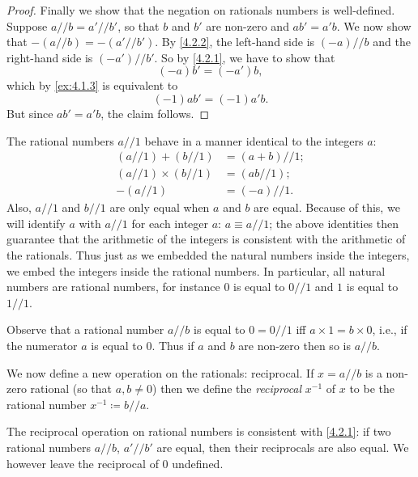 \begin{proof}
  Finally we show that the negation on rationals numbers is well-defined.
  Suppose \(a // b = a' // b'\), so that \(b\) and \(b'\) are non-zero and \(ab' = a'b\).
  We now show that \(-(a // b) = -(a' // b')\).
  By \cref{4.2.2}, the left-hand side is \((-a) // b\) and the right-hand side is \((-a') // b'\).
  So by \cref{4.2.1}, we have to show that
  \[
    (-a)b' = (-a')b,
  \]
  which by \cref{ex:4.1.3} is equivalent to
  \[
    (-1)ab' = (-1)a'b.
  \]
  But since \(ab' = a'b\), the claim follows.
\end{proof}

\begin{note}
  The rational numbers \(a // 1\) behave in a manner identical to the integers \(a\):
  \begin{align*}
    (a // 1) + (b // 1)      & = (a + b) // 1; \\
    (a // 1) \times (b // 1) & = (ab // 1);    \\
    -(a // 1)                & = (-a) // 1.
  \end{align*}
  Also, \(a // 1\) and \(b // 1\) are only equal when \(a\) and \(b\) are equal.
  Because of this, we will identify \(a\) with \(a // 1\) for each integer \(a\): \(a \equiv a // 1\);
  the above identities then guarantee that the arithmetic of the integers is consistent with the arithmetic of the rationals.
  Thus just as we embedded the natural numbers inside the integers, we embed the integers inside the rational numbers.
  In particular, all natural numbers are rational numbers, for instance \(0\) is equal to \(0 // 1\) and \(1\) is equal to \(1 // 1\).
\end{note}

\begin{note}
  Observe that a rational number \(a // b\) is equal to \(0 = 0 // 1\) iff \(a \times 1 = b \times 0\), i.e., if the numerator \(a\) is equal to \(0\).
  Thus if \(a\) and \(b\) are non-zero then so is \(a // b\).
\end{note}

\begin{note}
  We now define a new operation on the rationals: reciprocal.
  If \(x = a // b\) is a non-zero rational (so that \(a, b \neq 0\)) then we define the \emph{reciprocal} \(x^{-1}\) of \(x\) to be the rational number \(x^{-1} \coloneqq b // a\).
\end{note}

\begin{ac}\label{ac:4.2.2}
  The reciprocal operation on rational numbers is consistent with \cref{4.2.1}:
  if two rational numbers \(a // b\), \(a' // b'\) are equal, then their reciprocals are also equal.
  We however leave the reciprocal of \(0\) undefined.
\end{ac}

